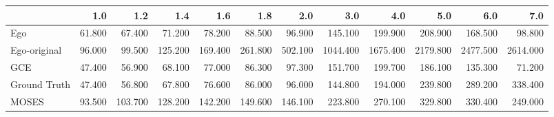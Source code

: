 \begin{tabular}{lrrrrrrrrrrr}
\toprule
{} &    1.0 &     1.2 &     1.4 &     1.6 &     1.8 &     2.0 &      3.0 &      4.0 &      5.0 &      6.0 &      7.0 \\
\midrule
Ego          & 61.800 &  67.400 &  71.200 &  78.200 &  88.500 &  96.900 &  145.100 &  199.900 &  208.900 &  168.500 &   98.800 \\
Ego-original & 96.000 &  99.500 & 125.200 & 169.400 & 261.800 & 502.100 & 1044.400 & 1675.400 & 2179.800 & 2477.500 & 2614.000 \\
GCE          & 47.400 &  56.900 &  68.100 &  77.000 &  86.300 &  97.300 &  151.700 &  199.700 &  186.100 &  135.300 &   71.200 \\
Ground Truth & 47.400 &  56.800 &  67.800 &  76.600 &  86.000 &  96.000 &  144.800 &  194.000 &  239.800 &  289.200 &  338.400 \\
MOSES        & 93.500 & 103.700 & 128.200 & 142.200 & 149.600 & 146.100 &  223.800 &  270.100 &  329.800 &  330.400 &  249.000 \\
\bottomrule
\end{tabular}
